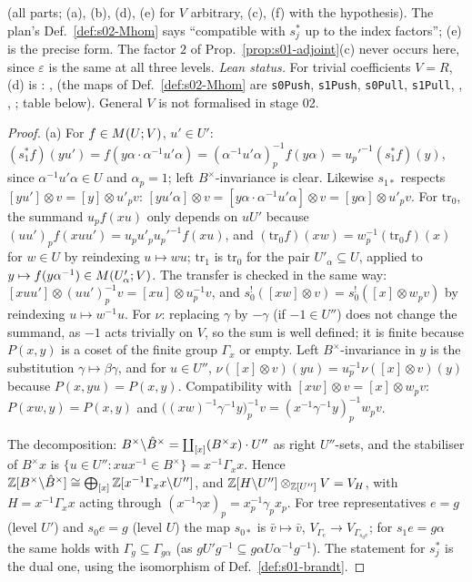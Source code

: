 \noindent\stproved{} (all parts; (a), (b), (d), (e) for $V$ arbitrary, (c), (f) with the hypothesis). The plan's Def.~\ref{def:s02-Mhom} says
``compatible with $s_j^*$ up to the index factors''; (e) is the precise form. The factor $2$ of
Prop.~\ref{prop:s01-adjoint}(c) never occurs here, since $\varepsilon$ is the same at all three levels.
\emph{Lean status.} For trivial coefficients $V=R$, (d) is \stformal: ,
 (the maps of Def.~\ref{def:s02-Mhom} are \texttt{s0Push}, \texttt{s1Push},
\texttt{s0Pull}, \texttt{s1Pull}, , , ; table below).
General $V$ is not formalised in stage 02.
\begin{proof}
(a) For $f\in M(U;V)$, $u'\in U'$: $(s_1^*f)(yu')=f(y\alpha\cdot\alpha^{-1}u'\alpha)=(\alpha^{-1}u'\alpha)_p^{-1}f(y\alpha)=u_p'^{-1}(s_1^*f)(y)$,
since $\alpha^{-1}u'\alpha\in U$ and $\alpha_p=1$; left $B^\times$-invariance is clear. Likewise $s_{1*}$ respects
$[yu']\otimes v=[y]\otimes u'_pv$: $[yu'\alpha]\otimes v=[y\alpha\cdot\alpha^{-1}u'\alpha]\otimes v=[y\alpha]\otimes u'_pv$. For $\mathrm{tr}_0$, the summand
$u_pf(xu)$ only depends on $uU'$ because $(uu')_pf(xuu')=u_pu'_pu_p'^{-1}f(xu)$, and $(\mathrm{tr}_0f)(xw)=w_p^{-1}(\mathrm{tr}_0f)(x)$ for $w\in U$
by reindexing $u\mapsto wu$; $\mathrm{tr}_1$ is $\mathrm{tr}_0$ for the pair $U'_\alpha\subseteq U$, applied to $y\mapsto f(y\alpha^{-1})\in M(U'_\alpha;V)$.
The transfer is checked in the same way: $[xuu']\otimes(uu')_p^{-1}v=[xu]\otimes u_p^{-1}v$, and $s_0^!([xw]\otimes v)=s_0^!([x]\otimes w_pv)$
by reindexing $u\mapsto w^{-1}u$. For $\nu$: replacing $\gamma$ by $-\gamma$ (if $-1\in U''$) does not change the summand, as $-1$ acts
trivially on $V$, so the sum is well defined; it is finite because $P(x,y)$ is a coset of the finite group $\Gamma_x$ or empty.
Left $B^\times$-invariance in $y$ is the substitution $\gamma\mapsto\beta\gamma$, and for $u\in U''$,
$\nu([x]\otimes v)(yu)=u_p^{-1}\nu([x]\otimes v)(y)$ because $P(x,yu)=P(x,y)$. Compatibility with $[xw]\otimes v=[x]\otimes w_pv$:
$P(xw,y)=P(x,y)$ and $\big((xw)^{-1}\gamma^{-1}y\big)_p^{-1}v=(x^{-1}\gamma^{-1}y)_p^{-1}w_pv$.

The decomposition: $B^\times\backslash\hat{B}^\times=\coprod_{[x]}(B^\times x)\cdot U''$ as right $U''$-sets, and the stabiliser of $B^\times x$
is $\{u\in U'':xux^{-1}\in B^\times\}=x^{-1}\Gamma_xx$. Hence $\mathbb{Z}[B^\times\backslash\hat{B}^\times]\cong\bigoplus_{[x]}\mathbb{Z}[x^{-1}\Gamma_xx\backslash U'']$, and
$\mathbb{Z}[H\backslash U'']\otimes_{\mathbb{Z}[U'']}V=V_H$, with $H=x^{-1}\Gamma_xx$ acting through $(x^{-1}\gamma x)_p=x_p^{-1}\gamma_px_p$. For tree representatives
$e=g$ (level $U'$) and $s_0e=g$ (level $U$) the map $s_{0*}$ is $\bar v\mapsto\bar v$, $V_{\Gamma_e}\to V_{\Gamma_{s_0e}}$; for $s_1e=g\alpha$ the same holds with
$\Gamma_g\subseteq\Gamma_{g\alpha}$ (as $gU'g^{-1}\subseteq g\alpha U\alpha^{-1}g^{-1}$). The statement for $s_j^*$ is the dual one, using the isomorphism
of Def.~\ref{def:s01-brandt}.


\end{proof}
